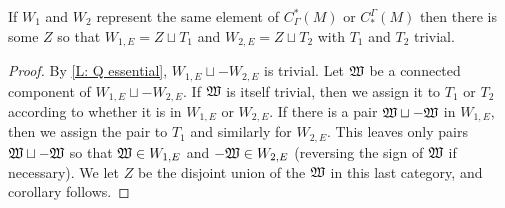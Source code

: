 \begin{corollary}\label{C: Q essential}
If $W_1$ and $W_2$ represent the same element of $C^*_\Gamma(M)$ or $C_*^\Gamma(M)$ then there is some $Z$ so that $W_{1,E}=Z\sqcup T_1$ and $W_{2,E}=Z\sqcup T_2$ with $T_1$ and $T_2$ trivial.
\end{corollary}
\begin{proof}
By \cref{L: Q essential}, $W_{1,E}\sqcup -W_{2,E}$ is trivial. Let $\mathfrak W$ be a connected component of $W_{1,E}\sqcup -W_{2,E}$. If $\mathfrak W$ is itself trivial, then we assign it to $T_1$ or $T_2$ according to whether it is in $W_{1,E}$ or $W_{2,E}$. If there is a pair $\mathfrak W\sqcup -\mathfrak W$ in $W_{1,E}$, then we assign the pair to $T_1$ and similarly for $W_{2,E}$. This leaves only pairs $\mathfrak W\sqcup -\mathfrak W$ so that $\mathfrak W\in W_{1,E}$ and $-\mathfrak W\in W_{2,E}$ (reversing the sign of $\mathfrak W$ if necessary). We let $Z$ be the disjoint union of the $\mathfrak W$ in this last category, and corollary follows. 
\end{proof}




